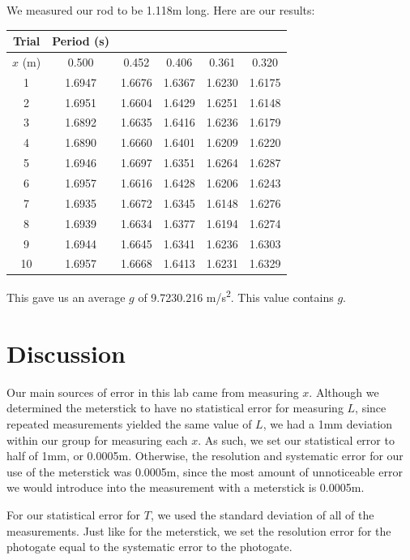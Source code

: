\documentclass[12pt]{article}
\begin{document}
We measured our rod to be 1.118m long. Here are our results:

\begin{center}
\begin{tabular}{c|ccccc|}
Trial & Period  (s) &  &  &  & \\
\hline
\(x\) (m) & 0.500 & 0.452 & 0.406 & 0.361 & 0.320\\
\hline
1 & 1.6947 & 1.6676 & 1.6367 & 1.6230 & 1.6175\\
2 & 1.6951 & 1.6604 & 1.6429 & 1.6251 & 1.6148\\
3 & 1.6892 & 1.6635 & 1.6416 & 1.6236 & 1.6179\\
4 & 1.6890 & 1.6660 & 1.6401 & 1.6209 & 1.6220\\
5 & 1.6946 & 1.6697 & 1.6351 & 1.6264 & 1.6287\\
6 & 1.6957 & 1.6616 & 1.6428 & 1.6206 & 1.6243\\
7 & 1.6935 & 1.6672 & 1.6345 & 1.6148 & 1.6276\\
8 & 1.6939 & 1.6634 & 1.6377 & 1.6194 & 1.6274\\
9 & 1.6944 & 1.6645 & 1.6341 & 1.6236 & 1.6303\\
10 & 1.6957 & 1.6668 & 1.6413 & 1.6231 & 1.6329\\
\end{tabular}
\end{center}

This gave us an average \(g\) of 9.723\textpm{}0.216 m/s\textsuperscript{2}. This value contains \(g\).
\section{Discussion}
\label{sec:org066cf64}

Our main sources of error in this lab came from measuring \(x\). Although we determined the meterstick to have no statistical error for measuring \(L\), since repeated measurements yielded the same value of \(L\), we had a 1mm deviation within our group for measuring each \(x\). As such, we set our statistical error to half of 1mm, or 0.0005m. Otherwise, the resolution and systematic error for our use of the meterstick was 0.0005m, since the most amount of unnoticeable error we would introduce into the measurement with a meterstick is 0.0005m.

For our statistical error for \(T\), we used the standard deviation of all of the measurements. Just like for the meterstick, we set the resolution error for the photogate equal to the systematic error to the photogate.
\end{document}
